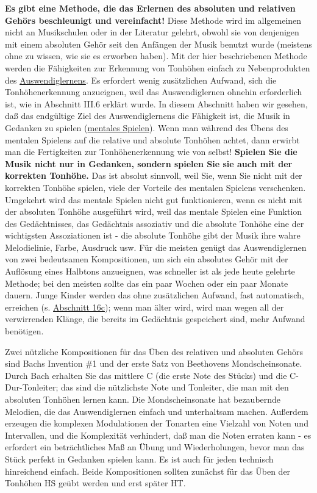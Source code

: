 \textbf{Es gibt eine Methode, die das Erlernen des absoluten und relativen Gehörs beschleunigt und vereinfacht!}
Diese Methode wird im allgemeinen nicht an Musikschulen oder in der Literatur gelehrt, obwohl sie von denjenigen mit einem absoluten Gehör seit den Anfängen der Musik benutzt wurde (meistens ohne zu wissen, wie sie es erworben haben).
Mit der hier beschriebenen Methode werden die Fähigkeiten zur Erkennung von Tonhöhen einfach zu Nebenprodukten des \hyperref[c1iii6]{Auswendiglernens}.
Es erfordert wenig zusätzlichen Aufwand, sich die Tonhöhenerkennung anzueignen, weil das Auswendiglernen ohnehin erforderlich ist, wie in Abschnitt III.6 erklärt wurde.
In diesem Abschnitt haben wir gesehen, daß das endgültige Ziel des Auswendiglernens die Fähigkeit ist, die Musik in Gedanken zu spielen (\hyperref[c1iii6tastatur]{mentales Spielen}).
Wenn man während des Übens des mentalen Spielens auf die relative und absolute Tonhöhen achtet, dann erwirbt man die Fertigkeiten zur Tonhöhenerkennung wie von selbst!
\textbf{Spielen Sie die Musik nicht nur in Gedanken, sondern spielen Sie sie auch mit der korrekten Tonhöhe.}
Das ist absolut sinnvoll, weil Sie, wenn Sie nicht mit der korrekten Tonhöhe spielen, viele der Vorteile des mentalen Spielens verschenken.
Umgekehrt wird das mentale Spielen nicht gut funktionieren, wenn es nicht mit der absoluten Tonhöhe ausgeführt wird, weil das mentale Spielen eine Funktion des Gedächtnisses, das Gedächtnis assoziativ und die absolute Tonhöhe eine der wichtigsten Assoziationen ist - die absolute Tonhöhe gibt der Musik ihre wahre Melodielinie, Farbe, Ausdruck usw.
Für die meisten genügt das Auswendiglernen von zwei bedeutsamen Kompositionen, um sich ein absolutes Gehör mit der Auflösung eines Halbtons anzueignen, was schneller ist als jede heute gelehrte Methode; bei den meisten sollte das ein paar Wochen oder ein paar Monate dauern.
Junge Kinder werden das ohne zusätzlichen Aufwand, fast automatisch, erreichen (s. \hyperref[c1iii16c]{Abschnitt 16c}); wenn man älter wird, wird man wegen all der verwirrenden Klänge, die bereits im Gedächtnis gespeichert sind, mehr Aufwand benötigen.

Zwei nützliche Kompositionen für das Üben des relativen und absoluten Gehörs sind Bachs Invention \#1 und der erste Satz von Beethovens Mondscheinsonate.
Durch Bach erhalten Sie das mittlere C (die erste Note des Stücks) und die C-Dur-Tonleiter; das sind die nützlichste Note und Tonleiter, die man mit den absoluten Tonhöhen lernen kann.
Die Mondscheinsonate hat bezaubernde Melodien, die das Auswendiglernen einfach und unterhaltsam machen.
Außerdem erzeugen die komplexen Modulationen der Tonarten eine Vielzahl von Noten und Intervallen, und die Komplexität verhindert, daß man die Noten erraten kann - es erfordert ein beträchtliches Maß an Übung und Wiederholungen, bevor man das Stück perfekt in Gedanken spielen kann.
Es ist auch für jeden technisch hinreichend einfach.
Beide Kompositionen sollten zunächst für das Üben der Tonhöhen HS geübt werden und erst später HT.

